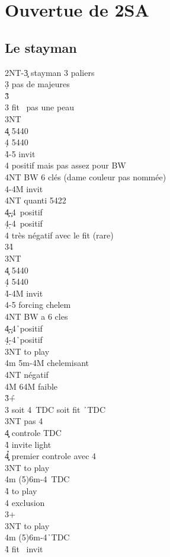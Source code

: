 \documentclass[a4paper]{article}
\begin{document}
\section{Ouvertue de 2SA}

\subsection{Le stayman}

\begin{bidtable}
2NT-3\c \> stayman 3 paliers\\
3\d \> pas de majeures\+\\
3\h {}\h \+\\
3\s \> fit \s\ pas une peau\\
3NT\+\\
4\c {} 5440\\
4\d {} 5440\\
4\h {}-5 invit\+\\
4\s \> positif mais pas assez pour BW\\
4NT \> BW 6 clés (dame couleur pas nommée)\-\\
4\s {}-4M invit\\
4NT \> quanti 5422\-\\
4\c {}\c -4\s\ positif\\
4\d {}\d -4\s\ positif\\
4\s \> très négatif avec le fit (rare)\-\\
3\s {}\h 4\s \+\\
3NT\+\\
4\c {} 5440\\
4\d {} 5440\\
4\h {}-4M invit\\
4\s {}-5 forcing chelem\+\\
4NT \> BW a 6 cles\-\-\\
4\c {}\c -4\h\ positif\\
4\d {}\d -4\h\ positif\-\\
3NT \> to play\\
4m \> 5m-4M chelemisant\+\\
4NT \> négatif\-\\
4M \> 64M faible\-\\
3\h {}+\h \+\\
3\s \> soit 4\s\ TDC soit fit \h\ TDC\+\\
3NT \> pas 4\s \+\\
4\c\d \> controle TDC \h \\
4\h \> invite light\-\\
4\c\d\h \> premier controle avec 4\s \-\\
3NT \> to play\\
4m \> (5)6m-4\s\ TDC\\
4\h \> to play\\
4\s \> exclusion\-\\
3\s {}+\s \+\\
3NT \> to play\\
4m \> (5)6m-4\h\ TDC\\
4\h \> fit \s\ invit\-
\end{bidtable}
\end{document}
